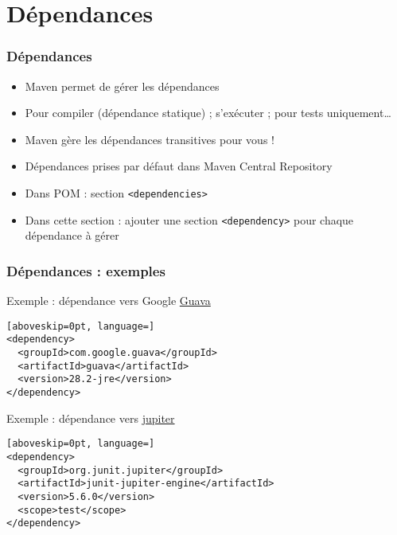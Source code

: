 \documentclass[english, french]{beamer}
\begin{document}
\section{Dépendances}
\begin{frame}
	\frametitle{Dépendances}
	\begin{itemize}
		\item Maven permet de gérer les \og{}dépendances\fg{}
		\item Pour compiler (dépendance statique) ; s’exécuter ; pour tests uniquement…
		\item Maven gère les dépendances transitives pour vous !
		\item Dépendances prises {\tiny par défaut} dans Maven Central Repository
		\item Dans POM : section \texttt{<dependencies>}
		\item Dans cette section : ajouter une section \texttt{<dependency>} pour chaque dépendance à gérer
	\end{itemize}
\end{frame}

\begin{frame}[fragile]
	\frametitle{Dépendances : exemples}
	\begin{block}{Exemple : dépendance vers Google \href{https://github.com/google/guava/blob/master/README.md}{Guava}}
		\begin{lstlisting}[aboveskip=0pt, language=]
<dependency>
  <groupId>com.google.guava</groupId>
  <artifactId>guava</artifactId>
  <version>28.2-jre</version>
</dependency>
\end{lstlisting}
	\end{block}
	\begin{block}{Exemple : dépendance vers \href{https://search.maven.org/search?q=g:org.junit.jupiter}{jupiter}}
		\begin{lstlisting}[aboveskip=0pt, language=]
<dependency>
  <groupId>org.junit.jupiter</groupId>
  <artifactId>junit-jupiter-engine</artifactId>
  <version>5.6.0</version>
  <scope>test</scope>
</dependency>
\end{lstlisting}
	\end{block}
\end{frame}
\end{document}
